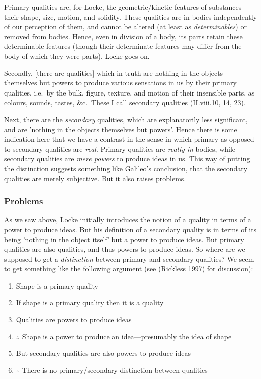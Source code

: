 \documentclass[12pt]{article}
\makeatletter
\newcommand{\citeprocitem}[2]{\hyper@linkstart{cite}{citeproc_bib_item_#1}#2\hyper@linkend}
\makeatother
\begin{document}
Primary qualities are, for Locke, the geometric/kinetic features of
substances -- their shape, size, motion, and solidity. These qualities
are in bodies independently of our perception of them, and cannot be
altered (at least as \emph{determinables}) or removed from bodies. Hence,
even in division of a body, its parts retain these determinable features
(though their determinate features may differ from the body of which
they were parts). Locke goes on.

\begin{quote-b}
Secondly, [there are qualities] which in truth are nothing in the
objects themselves but powers to produce various sensations in us by
their primary qualities, i.e. by the bulk, figure, texture, and motion
of their insensible parts, as colours, sounds, tastes, \&c. These I
call secondary qualities (II.viii.10, 14, 23).
\end{quote-b}

Next, there are the \emph{secondary} qualities, which are explanatorily less
significant, and are 'nothing in the objects themselves but powers'.
Hence there is some indication here that we have a contrast in the sense
in which primary as opposed to secondary qualities are \emph{real}. Primary
qualities are \emph{really in} bodies, while secondary qualities are \emph{mere
powers} to produce ideas in us. This way of putting the distinction
suggests something like Galileo's conclusion, that the secondary
qualities are merely subjective. But it also raises problems.

\subsubsection{Problems}
\label{sec:orgcb297b6}
As we saw above, Locke initially introduces the notion of a quality in
terms of a power to produce ideas. But his definition of a secondary
quality is in terms of its being 'nothing in the object itself' but a
power to produce ideas. But primary qualities are also qualities, and
thus powers to produce ideas. So where are we supposed to get a
\emph{distinction} between primary and secondary qualities? We seem to get
something like the following argument (see (\citeprocitem{6}{Rickless 1997}) for
discussion):

\begin{enumerate}
\item Shape is a primary quality
\item If shape is a primary quality then it is a quality
\item Qualities are powers to produce ideas
\item \(\therefore\) Shape is a power to produce an idea---presumably the idea of shape
\item But secondary qualities are also powers to produce ideas
\item \(\therefore\) There is no primary/secondary distinction between qualities
\end{enumerate}
\end{document}
